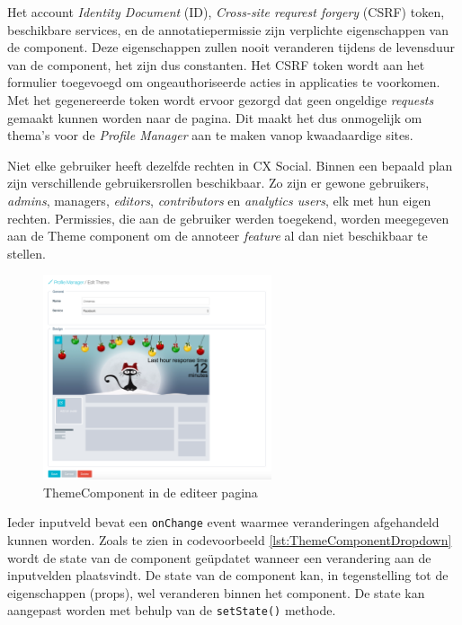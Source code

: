 Het account \textit{Identity Document} (ID), \textit{Cross-site requrest forgery} (CSRF) token, beschikbare services, en de annotatiepermissie zijn verplichte eigenschappen van de component. Deze eigenschappen zullen nooit veranderen tijdens de levensduur van de component, het zijn dus constanten. Het CSRF token wordt aan het formulier toegevoegd om ongeauthoriseerde acties in applicaties te voorkomen. Met het gegenereerde token wordt ervoor gezorgd dat geen ongeldige \textit{requests} gemaakt kunnen worden naar de pagina. Dit maakt het dus onmogelijk om thema's voor de \textit{Profile Manager} aan te maken vanop kwaadaardige sites.  %

Niet elke gebruiker heeft dezelfde rechten in CX Social. Binnen een bepaald plan zijn verschillende gebruikersrollen beschikbaar. Zo zijn er gewone gebruikers, \textit{admins}, managers, \textit{editors}, \textit{contributors} en \textit{analytics users}, elk met hun eigen rechten. Permissies, die aan de gebruiker werden toegekend, worden meegegeven aan de Theme component om de annoteer \textit{feature} al dan niet beschikbaar te stellen.

\begin{figure}[H]
	\centering
	\includegraphics[width=0.6\textwidth]{Figuren/ThemeComponent.png}
	\caption{ThemeComponent in de editeer pagina}
	\label{fig:ThemeComponent}
\end{figure} 



Ieder inputveld bevat een \texttt{onChange} event waarmee veranderingen afgehandeld kunnen worden. Zoals te zien in codevoorbeeld \ref{lst:ThemeComponentDropdown} wordt de state van de component ge\"{u}pdatet wanneer een verandering aan de inputvelden plaatsvindt. De state van de component kan, in tegenstelling tot de eigenschappen (props), wel veranderen binnen het component. De state kan aangepast worden met behulp van  de \texttt{setState()} methode. 


